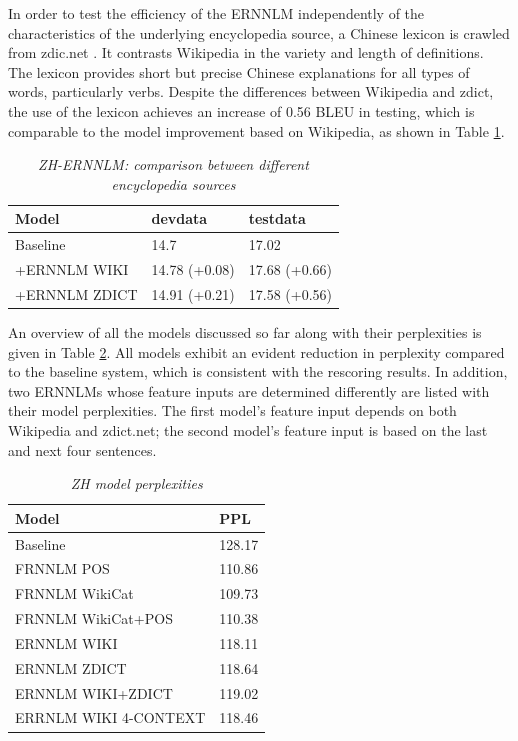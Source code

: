\documentclass[a4paper]{article}
\begin{document}
In order to test the efficiency of the ERNNLM independently of the characteristics of the underlying encyclopedia  source, a Chinese lexicon is crawled from zdic.net \cite{zdic}. It contrasts Wikipedia in the variety and length of definitions. The lexicon provides short but precise Chinese explanations for all types of words, particularly verbs. Despite the differences between Wikipedia and zdict, the use of the lexicon achieves an increase of 0.56 BLEU in testing, which is comparable to the
model improvement based on Wikipedia, as shown in Table \ref{tb:zh-extended-diff-sources}.

\begin{table}
\caption{\it ZH-ERNNLM: comparison between different encyclopedia sources}
\vspace{2mm}
\centering
  \begin{tabular}{lll}
  	\hline
  	Model         & devdata       & testdata      \\ \hline\hline
  	Baseline      & 14.7          & 17.02         \\ \hline
  	+ERNNLM WIKI  & 14.78 (+0.08) & 17.68 (+0.66) \\
  	+ERNNLM ZDICT & 14.91 (+0.21) & 17.58 (+0.56) \\ \hline
  \end{tabular}
  \label{tb:zh-extended-diff-sources}
\end{table}

An overview of all the models discussed so far along with their perplexities is given in Table \ref{tb:PPL}. All models exhibit an evident reduction in perplexity compared to the baseline system, which is consistent with the rescoring results. In addition, two ERNNLMs whose feature inputs are determined differently are listed with their model perplexities. The first model's feature input depends on both Wikipedia and zdict.net; the second model's feature input is based on the last and next four sentences.

\begin{table}
  \caption{\it ZH model perplexities}
  \vspace{2mm}
  \centering
  \begin{tabular}{ ll}
  	\hline
  	Model                 & PPL    \\ \hline\hline
  	Baseline              & 128.17 \\ \hline
  	FRNNLM POS            & 110.86 \\
  	FRNNLM WikiCat        & 109.73 \\
  	FRNNLM WikiCat+POS    & 110.38 \\ \hline
  	ERNNLM WIKI           & 118.11 \\
  	ERNNLM ZDICT          & 118.64 \\
  	ERNNLM WIKI+ZDICT     & 119.02 \\
  	ERRNLM WIKI 4-CONTEXT & 118.46 \\ \hline
  \end{tabular}
  \label{tb:PPL}
\end{table}
\end{document}
